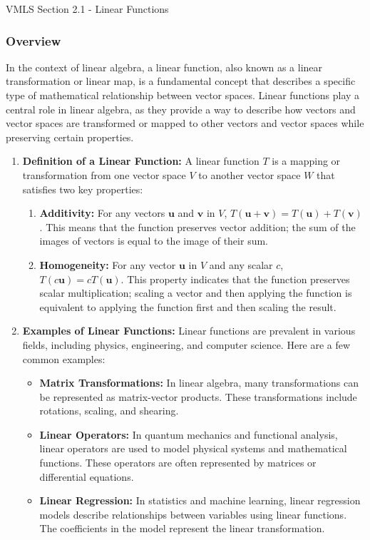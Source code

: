 \begin{notes}{VMLS Section 2.1 - Linear Functions}
    \subsubsection*{Overview}

    In the context of linear algebra, a linear function, also known as a linear transformation or linear map, is a fundamental concept that describes a specific type of mathematical relationship between 
    vector spaces. Linear functions play a central role in linear algebra, as they provide a way to describe how vectors and vector spaces are transformed or mapped to other vectors and vector spaces while 
    preserving certain properties.
    
    \begin{enumerate}
        \item \textbf{Definition of a Linear Function:} A linear function \(T\) is a mapping or transformation from one vector space \(V\) to another vector space \(W\) that satisfies two key properties:
        \begin{enumerate}
            \item \textbf{Additivity:} For any vectors \(\mathbf{u}\) and \(\mathbf{v}\) in \(V\), \(T(\mathbf{u} + \mathbf{v}) = T(\mathbf{u}) + T(\mathbf{v})\). This means that the function preserves vector 
            addition; the sum of the images of vectors is equal to the image of their sum.
            \item \textbf{Homogeneity:} For any vector \(\mathbf{u}\) in \(V\) and any scalar \(c\), \(T(c\mathbf{u}) = cT(\mathbf{u})\). This property indicates that the function preserves scalar multiplication; 
            scaling a vector and then applying the function is equivalent to applying the function first and then scaling the result.
        \end{enumerate}
        
        \item \textbf{Examples of Linear Functions:} Linear functions are prevalent in various fields, including physics, engineering, and computer science. Here are a few common examples:
        \begin{itemize}
            \item \textbf{Matrix Transformations:} In linear algebra, many transformations can be represented as matrix-vector products. These transformations include rotations, scaling, and shearing.
            \item \textbf{Linear Operators:} In quantum mechanics and functional analysis, linear operators are used to model physical systems and mathematical functions. These operators are often represented 
            by matrices or differential equations.
            \item \textbf{Linear Regression:} In statistics and machine learning, linear regression models describe relationships between variables using linear functions. The coefficients in the model represent 
            the linear transformation.
        \end{itemize}
        

\end{enumerate}
\end{notes}
